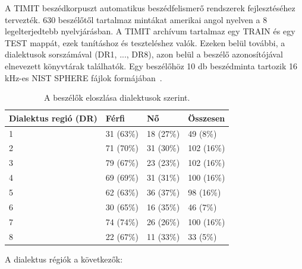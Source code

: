 A TIMIT beszédkorpuszt automatikus beszédfelismerő rendszerek fejlesztéséhez tervezték. 630 beszélőtől tartalmaz mintákat amerikai angol nyelven a 8 legelterjedtebb nyelvjárásban.
A TIMIT archívum tartalmaz egy TRAIN és egy TEST mappát, ezek tanításhoz és teszteléshez valók. Ezeken belül további, a dialektusok sorszámával (DR1, ..., DR8), azon belül a beszélő azonosítójával elnevezett könyvtárak találhatók. Egy beszélőhöz
10 db beszédminta tartozik 16 kHz-es NIST SPHERE fájlok formájában~\cite{timit}.
\newline
\newline
\begin{table}[!ht]
	\begin{tabular}{*4l} \toprule
		\bfseries Dialektus regió (DR) & \bfseries Férfi & \bfseries Nő & \bfseries Összesen \\ \midrule
		1                             & 31 (63\%)      & 18 (27\%)   & 49 (8\%)          \\
		\rowcolor{gray!10} 
		2                             & 71 (70\%)      & 31 (30\%)   & 102 (16\%)        \\
		3                             & 79 (67\%)      & 23 (23\%)   & 102 (16\%)        \\
		\rowcolor{gray!10} 
		4                             & 69 (69\%)      & 31 (31\%)   & 100 (16\%)        \\
		5                             & 62 (63\%)      & 36 (37\%)   & 98 (16\%)         \\
		\rowcolor{gray!10} 
		6                             & 30 (65\%)      & 16 (35\%)   & 46 (7\%)          \\
		7                             & 74 (74\%)      & 26 (26\%)   & 100 (16\%)        \\
		\rowcolor{gray!10} 
		8                             & 22 (67\%)      & 11 (33\%)   & 33 (5\%)          \\
		\bottomrule
		\hline
	\end{tabular}
	\centering
	\caption{A beszélők eloszlása dialektusok szerint.}
	\label{fig:timit-dialects}
\end{table}
\newpage
A dialektus régiók a következők:

